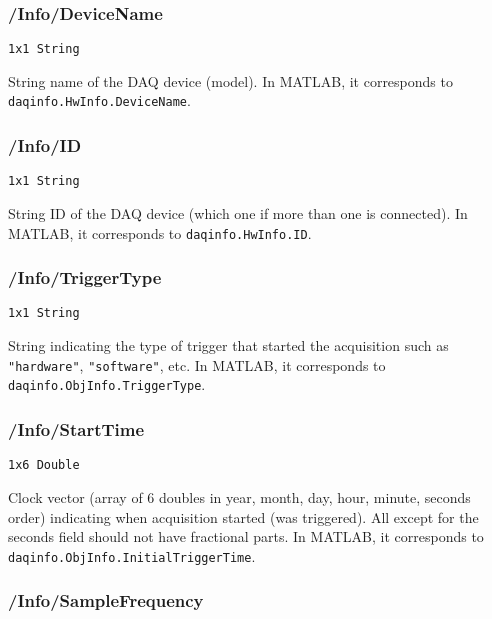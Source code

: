 \documentclass[12pt]{article} %
\begin{document}
\subsubsection{/Info/DeviceName}

\verb|1x1 String|

String name of the DAQ device (model).
In MATLAB\textsuperscript{\textregistered}, it corresponds to \newline \verb|daqinfo.HwInfo.DeviceName|.




\subsubsection{/Info/ID}

\verb|1x1 String|

String ID of the DAQ device (which one if more than one is connected).
In MATLAB\textsuperscript{\textregistered}, it corresponds to \verb|daqinfo.HwInfo.ID|.



\subsubsection{/Info/TriggerType}

\verb|1x1 String|

String indicating the type of trigger that started the acquisition such as \verb|"hardware"|, \verb|"software"|, etc.
In MATLAB\textsuperscript{\textregistered}, it corresponds to \verb|daqinfo.ObjInfo.TriggerType|.



\subsubsection{/Info/StartTime}

\verb|1x6 Double|

Clock vector (array of 6 doubles in year, month, day, hour, minute, seconds order) indicating when acquisition started (was triggered).
All except for the seconds field should not have fractional parts.
In MATLAB\textsuperscript{\textregistered}, it corresponds to \\ \verb|daqinfo.ObjInfo.InitialTriggerTime|.



\subsubsection{/Info/SampleFrequency}
\end{document}
